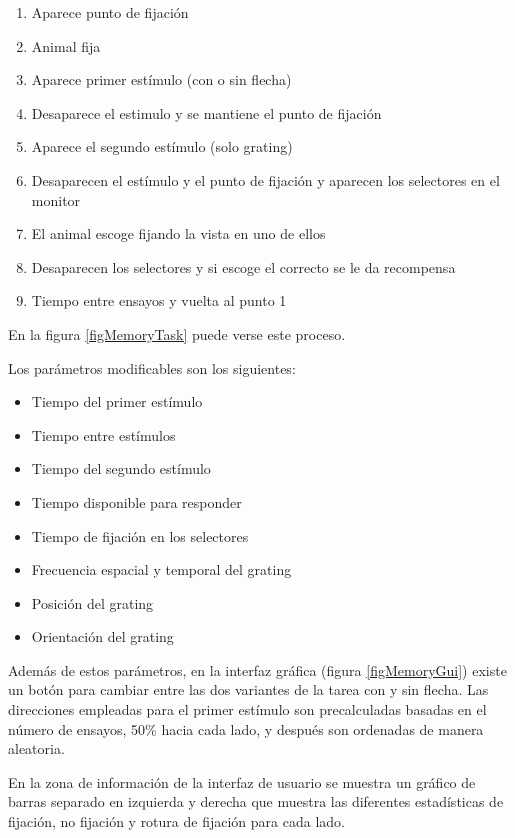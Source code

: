 \documentclass[conference]{IEEEtran}
\begin{document}
\begin{enumerate}
	\item Aparece punto de fijación
	\item Animal fija
	\item Aparece primer estímulo (con o sin flecha)
	\item Desaparece el estimulo y se mantiene el punto de fijación
	\item Aparece el segundo estímulo (solo grating)
	\item Desaparecen el estímulo y el punto de fijación y aparecen los selectores en el monitor
	\item El animal escoge fijando la vista en uno de ellos
	\item Desaparecen los selectores y si escoge el correcto se le da recompensa
	\item Tiempo entre ensayos y vuelta al punto 1
\end{enumerate}

En la figura \ref{figMemoryTask} puede verse este proceso. 


Los parámetros modificables son los siguientes:

\begin{itemize}
	\item Tiempo del primer estímulo
	\item Tiempo entre estímulos
	\item Tiempo del segundo estímulo
	\item Tiempo disponible para responder
	\item Tiempo de fijación en los selectores
	\item Frecuencia espacial y temporal del grating
	\item Posición del grating
	\item Orientación del grating

\end{itemize}


Además de estos parámetros, en la interfaz gráfica (figura \ref{figMemoryGui}) existe un botón para cambiar entre las dos variantes de la tarea con y sin flecha.
Las direcciones empleadas para el primer estímulo son precalculadas basadas en el número de ensayos, 50\% hacia cada lado, y después son ordenadas de manera aleatoria.

En la zona de información de la interfaz de usuario se muestra un gráfico de barras separado en izquierda y derecha que muestra las diferentes estadísticas de fijación, no fijación y rotura de fijación para cada lado.
\end{document}
